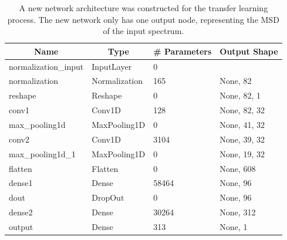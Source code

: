 \bgroup
\def\arraystretch{1.5}
\begin{table}[]
    \centering
        \begin{tabular}{|l|l|l|l|}
        \hline
        \multicolumn{1}{|c|}{\textbf{Name}} & \multicolumn{1}{c|}{\textbf{Type}} & \multicolumn{1}{c|}{\textbf{\# Parameters}} & \multicolumn{1}{c|}{\textbf{Output Shape}} \\ \hline
        normalization\_input                & InputLayer                         & 0                                           &                                            \\ \hline
        normalization                       & Normalization                      & 165                                         & None, 82                                   \\ \hline
        reshape                             & Reshape                            & 0                                           & None, 82, 1                                \\ \hline
        conv1                               & Conv1D                             & 128                                         & None, 82, 32                               \\ \hline
        max\_pooling1d                      & MaxPooling1D                       & 0                                           & None, 41, 32                               \\ \hline
        conv2                               & Conv1D                             & 3104                                        & None, 39, 32                               \\ \hline
        max\_pooling1d\_1                   & MaxPooling1D                       & 0                                           & None, 19, 32                               \\ \hline
        flatten                             & Flatten                            & 0                                           & None, 608                                  \\ \hline
        dense1                               & Dense                              & 58464                                       & None, 96                                   \\ \hline
        dout                                & DropOut                            & 0                                           & None, 96                                   \\ \hline
        dense2                              & Dense                              & 30264                                       & None, 312                                  \\ \hline
        output                              & Dense                              & 313                                         & None, 1                                    \\ \hline
    \end{tabular}
    \caption{A new network architecture was constructed for the transfer learning process. The new network only has one output node, representing the MSD of the input spectrum.}
    \label{tab:meta-1}
\end{table}
